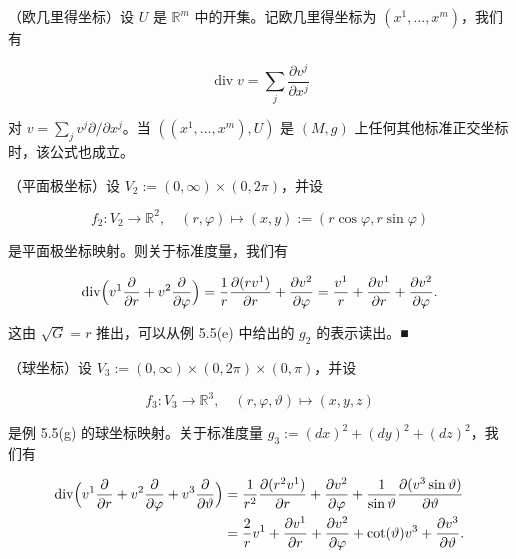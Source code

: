 \begin{example}

\begin{items}
\item

（欧几里得坐标）设 $ U $ 是 $ \mathbb{R}^m $ 中的开集。记欧几里得坐标为 $ (x^1,\ldots,x^m) $，我们有

\[
\operatorname{div} v = \sum_{j}\frac{\partial v^{j}}{\partial x^{j}}
\]

对 $ v = \sum_j v^j\partial/\partial x^j $。当 $ ((x^1,\ldots,x^m),U) $ 是 $ (M,g) $ 上任何其他标准正交坐标时，该公式也成立。

\item

（平面极坐标）设 $ V_2 := (0,\infty)\times(0,2\pi) $，并设

\[
f_2: V_2 \to \mathbb{R}^{2}, \quad (r,\varphi) \mapsto (x,y) := (r\cos\varphi, r\sin\varphi)
\]

是平面极坐标映射。则关于标准度量，我们有

\[
\operatorname{div}\Bigl(v^{1}\frac{\partial}{\partial r} + v^{2}\frac{\partial}{\partial\varphi}\Bigr) = \frac{1}{r}\frac{\partial(rv^{1})}{\partial r} + \frac{\partial v^{2}}{\partial\varphi} = \frac{v^{1}}{r} + \frac{\partial v^{1}}{\partial r} + \frac{\partial v^{2}}{\partial\varphi}.
\]

\proofhead
这由 $ \sqrt{G} = r $ 推出，可以从例 5.5(e) 中给出的 $ g_2 $ 的表示读出。\nobreak\hspace{0.35em}■
\item

（球坐标）设 $ V_3 := (0,\infty)\times(0,2\pi)\times(0,\pi) $，并设

\[
f_3: V_3 \to \mathbb{R}^{3}, \quad (r,\varphi,\vartheta) \mapsto (x,y,z)
\]

是例 5.5(g) 的球坐标映射。关于标准度量 $ g_3 := (dx)^2 + (dy)^2 + (dz)^2 $，我们有

\begin{equation*}
\begin{aligned}
\operatorname{div}\Bigl(v^{1}\frac{\partial}{\partial r} + v^{2}\frac{\partial}{\partial\varphi} + v^{3}\frac{\partial}{\partial\vartheta}\Bigr) &= \frac{1}{r^{2}}\frac{\partial(r^{2}v^{1})}{\partial r} + \frac{\partial v^{2}}{\partial\varphi} + \frac{1}{\sin\vartheta}\frac{\partial(v^{3}\sin\vartheta)}{\partial\vartheta} \\ &= \frac{2}{r}v^{1} + \frac{\partial v^{1}}{\partial r} + \frac{\partial v^{2}}{\partial\varphi} + \cot(\vartheta)v^{3} + \frac{\partial v^{3}}{\partial\vartheta}.
\end{aligned}
\end{equation*}


\end{items}
\end{example}
